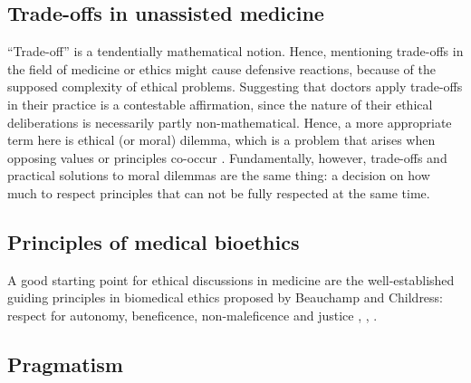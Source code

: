 
\subsection{Trade-offs in unassisted medicine}
``Trade-off'' is a tendentially mathematical notion.
Hence, mentioning trade-offs in the field of medicine or ethics might cause defensive reactions, because of the supposed complexity of ethical problems.
Suggesting that doctors apply trade-offs in their practice is a contestable affirmation, since the nature of their ethical deliberations is necessarily partly non-mathematical.
Hence, a more appropriate term here is ethical (or moral) dilemma, which is a problem that arises when opposing values or principles co-occur \cite[p.~351]{Dijkstra2020}.
Fundamentally, however, trade-offs and practical solutions to moral dilemmas are the same thing: a decision on how much to respect principles that can not be fully respected at the same time.

\subsection{Principles of medical bioethics}
A good starting point for ethical discussions in medicine are the well-established guiding principles in biomedical ethics proposed by Beauchamp and Childress: respect for autonomy, beneficence, non-maleficence and justice \cite[pp.~344-345]{Dijkstra2020}, \cite[p.~2]{Morley2020}, \cite[p.~2]{Rajkomar2018}.


\subsection{Pragmatism}
